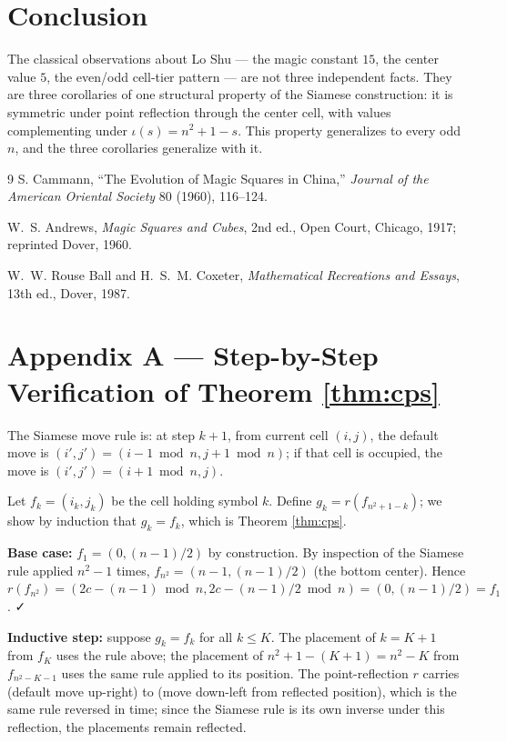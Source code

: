 \documentclass[11pt]{article}
\begin{document}
\section{Conclusion}

The classical observations about Lo Shu --- the magic constant $15$, the
center value $5$, the even/odd cell-tier pattern --- are not three
independent facts. They are three corollaries of one structural property
of the Siamese construction: it is symmetric under point reflection
through the center cell, with values complementing under
$\iota(s) = n^2 + 1 - s$. This property generalizes to every odd $n$,
and the three corollaries generalize with it.

\begin{thebibliography}{9}
S. Cammann,
``The Evolution of Magic Squares in China,''
\emph{Journal of the American Oriental Society} 80 (1960), 116--124.

W.~S. Andrews,
\emph{Magic Squares and Cubes},
2nd ed., Open Court, Chicago, 1917; reprinted Dover, 1960.

W.~W. Rouse Ball and H.~S.~M. Coxeter,
\emph{Mathematical Recreations and Essays},
13th ed., Dover, 1987.
\end{thebibliography}

\appendix

\section{Appendix A --- Step-by-Step Verification of Theorem \ref{thm:cps}}

The Siamese move rule is: at step $k+1$, from current cell $(i, j)$, the
default move is $(i', j') = (i - 1 \bmod n, j + 1 \bmod n)$; if that cell
is occupied, the move is $(i', j') = (i + 1 \bmod n, j)$.

Let $f_k = (i_k, j_k)$ be the cell holding symbol $k$. Define
$g_k = r(f_{n^2 + 1 - k})$; we show by induction that $g_k = f_k$, which
is Theorem \ref{thm:cps}.

\textbf{Base case:} $f_1 = (0, (n-1)/2)$ by construction. By inspection of the
Siamese rule applied $n^2 - 1$ times, $f_{n^2} = (n-1, (n-1)/2)$ (the bottom
center). Hence $r(f_{n^2}) = (2c - (n-1) \bmod n, 2c - (n-1)/2 \bmod n) = (0, (n-1)/2) = f_1$. ✓

\textbf{Inductive step:} suppose $g_k = f_k$ for all $k \leq K$. The placement of
$k = K + 1$ from $f_K$ uses the rule above; the placement of $n^2 + 1 - (K+1) = n^2 - K$
from $f_{n^2 - K - 1}$ uses the same rule applied to its position. The point-reflection
$r$ carries (default move up-right) to (move down-left from reflected position),
which is the same rule reversed in time; since the Siamese rule is its own
inverse under this reflection, the placements remain reflected.
\end{document}
